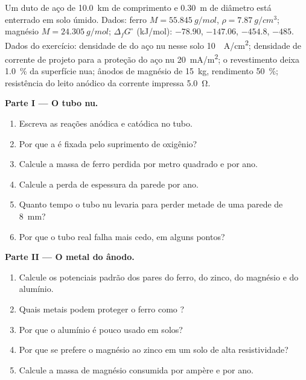 \begin{problem}
\label{pb:b2:corrosion:1}
Um duto de aço de \qty{10.0}{km} de comprimento e \qty{0.30}{m} de diâmetro está
enterrado em solo úmido. Dados: ferro $M = \qty{55.845}{g/mol}$, $\rho = \qty{7.87}{g/cm^3}$;
magnésio $M = \qty{24.305}{g/mol}$; $\Delta_f G^\circ$ (\unit{kJ/mol}): 
$-78.90$,  $-147.06$,  $-454.8$,  $-485$. Dados do
exercício: densidade de  do aço nu nesse solo \qty{10}{\micro
A/cm^2}; densidade de corrente de projeto para a proteção do aço nu
\qty{20}{mA/m^2}; o revestimento deixa 1.0~\% da superfície nua; ânodos de
magnésio de \qty{15}{kg}, rendimento 50~\%; resistência do leito anódico da
corrente impressa \qty{5.0}{\ohm}.

\medskip
\noindent\textbf{Parte I --- O tubo nu.}
\begin{enumerate}
  \item Escreva as reações anódica e catódica no tubo.
  \item Por que a  é fixada pelo suprimento de oxigênio?
  \item Calcule a massa de ferro perdida por metro quadrado e por ano.
  \item Calcule a perda de espessura da parede por ano.
  \item Quanto tempo o tubo nu levaria para perder metade de uma parede de \qty{8}{mm}?
  \item Por que o tubo real falha mais cedo, em alguns pontos?
\end{enumerate}

\medskip
\noindent\textbf{Parte II --- O metal do ânodo.}
\begin{enumerate}[resume]
  \item Calcule os potenciais padrão dos pares do ferro, do zinco, do magnésio
        e do alumínio.
  \item Quais metais podem proteger o ferro como ?
  \item Por que o alumínio é pouco usado em solos?
  \item Por que se prefere o magnésio ao zinco em um solo de alta resistividade?
  \item Calcule a massa de magnésio consumida por ampère e por ano.
\end{enumerate}


\end{problem}
